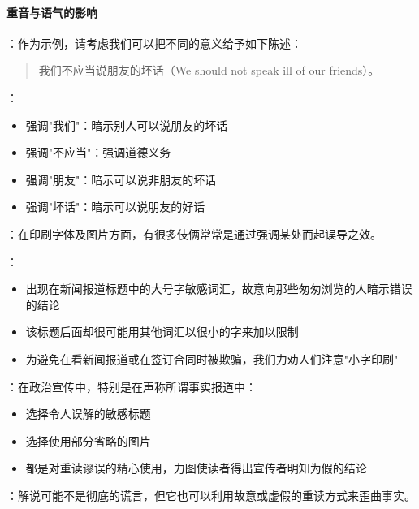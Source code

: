 \paragraph{重音与语气的影响}
\begin{examplebox}[title=重音与语气的影响]
：作为示例，请考虑我们可以把不同的意义给予如下陈述：

\begin{quote}
我们不应当说朋友的坏话（We should not speak ill of our friends）。
\end{quote}

：
\begin{itemize}
  \item 强调"我们"：暗示别人可以说朋友的坏话
  \item 强调"不应当"：强调道德义务
  \item 强调"朋友"：暗示可以说非朋友的坏话
  \item 强调"坏话"：暗示可以说朋友的好话
\end{itemize}

：在印刷字体及图片方面，有很多伎俩常常是通过强调某处而起误导之效。

：
\begin{itemize}
  \item 出现在新闻报道标题中的大号字敏感词汇，故意向那些匆匆浏览的人暗示错误的结论
  \item 该标题后面却很可能用其他词汇以很小的字来加以限制
  \item 为避免在看新闻报道或在签订合同时被欺骗，我们力劝人们注意"小字印刷"
\end{itemize}

：在政治宣传中，特别是在声称所谓事实报道中：
\begin{itemize}
  \item 选择令人误解的敏感标题
  \item 选择使用部分省略的图片
  \item 都是对重读谬误的精心使用，力图使读者得出宣传者明知为假的结论
\end{itemize}

：解说可能不是彻底的谎言，但它也可以利用故意或虚假的重读方式来歪曲事实。
\end{examplebox}

